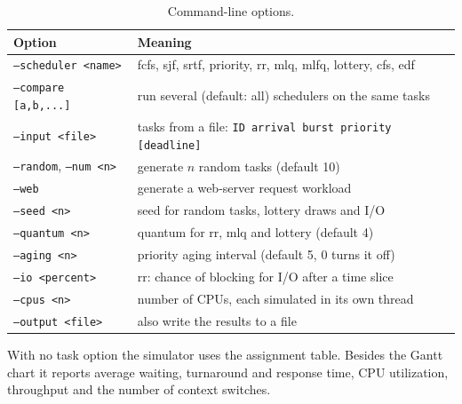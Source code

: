 \documentclass[11pt]{article}
\begin{document}
\begin{table}[H]
  \centering
  \begin{tabular}{ll}
    \toprule
    Option & Meaning \\
    \midrule
    \texttt{--scheduler <name>} & fcfs, sjf, srtf, priority, rr, mlq, mlfq, lottery, cfs, edf \\
    \texttt{--compare [a,b,...]} & run several (default: all) schedulers on the same tasks \\
    \texttt{--input <file>} & tasks from a file: \texttt{ID arrival burst priority [deadline]} \\
    \texttt{--random}, \texttt{--num <n>} & generate $n$ random tasks (default 10) \\
    \texttt{--web} & generate a web-server request workload \\
    \texttt{--seed <n>} & seed for random tasks, lottery draws and I/O \\
    \texttt{--quantum <n>} & quantum for rr, mlq and lottery (default 4) \\
    \texttt{--aging <n>} & priority aging interval (default 5, 0 turns it off) \\
    \texttt{--io <percent>} & rr: chance of blocking for I/O after a time slice \\
    \texttt{--cpus <n>} & number of CPUs, each simulated in its own thread \\
    \texttt{--output <file>} & also write the results to a file \\
    \bottomrule
  \end{tabular}
  \caption{Command-line options.}
\end{table}

With no task option the simulator uses the assignment table. Besides the Gantt chart it
reports average waiting, turnaround and response time, CPU utilization, throughput and
the number of context switches.
\end{document}
